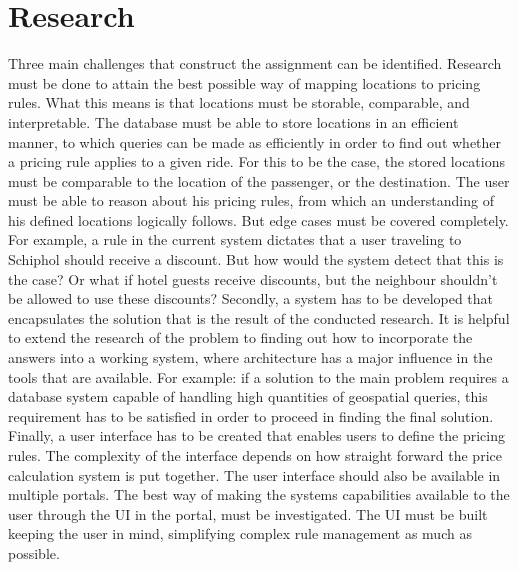 \section{Research}
Three main challenges that construct the assignment can be identified. Research must be done to attain the best possible way of mapping locations to pricing rules. What this means is that locations must be storable, comparable, and interpretable. The database must be able to store locations in an efficient manner, to which queries can be made as efficiently in order to find out whether a pricing rule applies to a given ride. For this to be the case, the stored locations must be comparable to the location of the passenger, or the destination. The user must be able to reason about his pricing rules, from which an understanding of his defined locations logically follows. But edge cases must be covered completely. For example, a rule in the current system dictates that a user traveling to Schiphol should receive a discount. But how would the system detect that this is the case? Or what if hotel guests receive discounts, but the neighbour shouldn't be allowed to use these discounts? Secondly, a system has to be developed that encapsulates the solution that is the result of the conducted research. It is helpful to extend the research of the problem to finding out how to incorporate the answers into a working system, where architecture has a major influence in the tools that are available. For example: if a solution to the main problem requires a database system capable of handling high quantities of geospatial queries, this requirement has to be satisfied in order to proceed in finding the final solution. Finally, a user interface has to be created that enables users to define the pricing rules. The complexity of the interface depends on how straight forward the price calculation system is put together. The user interface should also be available in multiple portals. The best way of making the systems capabilities available to the user through the UI in the portal, must be investigated. The UI must be built keeping the user in mind, simplifying complex rule management as much as possible.

